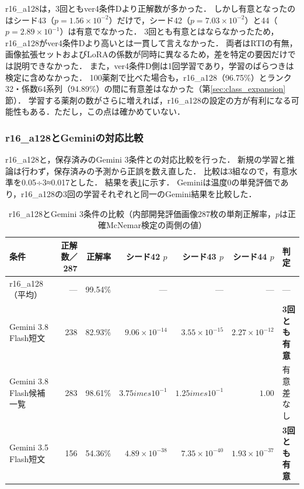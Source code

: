 \documentclass[uplatex,dvipdfmx]{jsarticle}
\begin{document}
r16\_a128は，3回ともver4条件Dより正解数が多かった．
しかし有意となったのはシード43（$p=1.56\times10^{-2}$）だけで，シード42（$p=7.03\times10^{-2}$）と44（$p=2.89\times10^{-1}$）は有意でなかった．
3回とも有意とはならなかったため，r16\_a128がver4条件Dより高いとは一貫して言えなかった．
両者はRTIの有無，画像拡張セットおよびLoRAの係数が同時に異なるため，差を特定の要因だけでは説明できなかった．
また，ver4条件D側は1回学習であり，学習のばらつきは検定に含めなかった．
100薬剤で比べた場合も，r16\_a128（96.75\%）とランク32・係数64系列（94.89\%）の間に有意差はなかった（第\ref{sec:class_expansion}節）．
学習する薬剤の数がさらに増えれば，r16\_a128の設定の方が有利になる可能性もある．ただし，この点は確かめていない．

\subsubsection{r16\_a128とGeminiの対応比較}\label{sec:r16a128_gemini}

r16\_a128と，保存済みのGemini 3条件との対応比較を行った．
新規の学習と推論は行わず，保存済みの予測から正誤を数え直した．
比較は3組なので，有意水準を0.05÷3≈0.017とした．
結果を表\ref{tab:r16a128_gemini_test}に示す．
Geminiは温度0の単発評価であり，r16\_a128の3回の学習それぞれと同一のGemini結果を比較した．

\begin{table}[htbp]
  \centering
  \caption{r16\_a128とGemini 3条件の比較（内部開発評価画像287枚の単剤正解率，$p$は正確McNemar検定の両側の値）}
  \label{tab:r16a128_gemini_test}
  \small
  \setlength{\tabcolsep}{3pt}
  \begin{tabular}{|l|r|r|r|r|r|l|}
    \hline
    条件 & 正解数／287 & 正解率 & シード42 $p$ & シード43 $p$ & シード44 $p$ & 判定 \\ \hline
    r16\_a128（平均） & --- & 99.54\% & --- & --- & --- & --- \\ \hline
    Gemini 3.8 Flash短文 & 238 & 82.93\% & $9.06\times10^{-14}$ & $3.55\times10^{-15}$ & $2.27\times10^{-12}$ & \textbf{3回とも有意} \\ \hline
    Gemini 3.8 Flash候補一覧 & 283 & 98.61\% & $3.75	imes10^{-1}$ & $1.25	imes10^{-1}$ & $1.00$ & 有意差なし \\ \hline
    Gemini 3.5 Flash短文 & 156 & 54.36\% & $4.89\times10^{-38}$ & $7.35\times10^{-40}$ & $1.93\times10^{-37}$ & \textbf{3回とも有意} \\ \hline
  \end{tabular}
\end{table}
\end{document}
